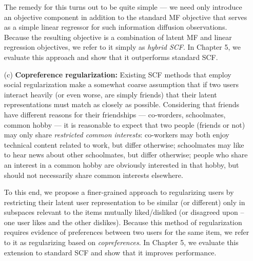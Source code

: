 \begin{enumerate}
The remedy for
this turns out to be quite simple --- we need only introduce an
objective component in addition to the standard MF objective that
serves as a simple linear regressor for such information diffusion
observations.  Because the resulting objective is a combination of
latent MF and linear regression objectives, we refer to it simply as
\emph{hybrid SCF}.  In Chapter 5, we evaluate this
approach and show that it outperforms standard SCF.
\item[(c)] {\bf Copreference regularization:} Existing SCF methods
that employ social regularization make a somewhat coarse assumption
that if two users interact heavily (or even worse, are simply friends)
that their latent representations must match as closely as possible.
Considering that friends have different reasons for their friendships
--- co-worders, schoolmates, common hobby --- it is reasonable to
expect that two people (friends or not) may only share
\emph{restricted common interests}: co-workers may both enjoy
technical content related to work, but differ otherwise; schoolmates
may like to hear news about other schoolmates, but differ otherwise;
people who share an interest in a common hobby are obviously
interested in that hobby, but should not necessarily share common
interests elsewhere.  

To this end, we propose a finer-grained approach
to regularizing users by restricting their latent user representation
to be similar (or different) only in subspaces relevant to the items
mutually liked/disliked (or disagreed upon -- one user likes and the
other dislikes).  Because this method of regularization requires
evidence of preferences between two users for the same item, we refer
to it as regularizing based on \emph{copreferences}.
In Chapter 5, we evaluate this extension to standard
SCF and show that it improves performance.
\end{enumerate}

